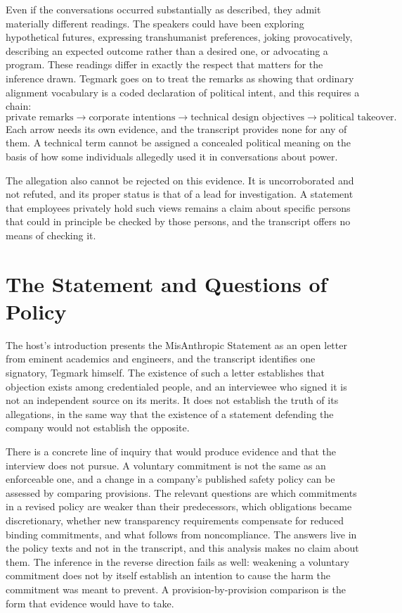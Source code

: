 \documentclass[11pt]{article}
\begin{document}
Even if the conversations occurred substantially as described, they admit materially different readings. The speakers could have been exploring hypothetical futures, expressing transhumanist preferences, joking provocatively, describing an expected outcome rather than a desired one, or advocating a program. These readings differ in exactly the respect that matters for the inference drawn. Tegmark goes on to treat the remarks as showing that ordinary alignment vocabulary is a coded declaration of political intent, and this requires a chain:
\[
\text{private remarks} \longrightarrow \text{corporate intentions} \longrightarrow \text{technical design objectives} \longrightarrow \text{political takeover}.
\]
Each arrow needs its own evidence, and the transcript provides none for any of them. A technical term cannot be assigned a concealed political meaning on the basis of how some individuals allegedly used it in conversations about power.

The allegation also cannot be rejected on this evidence. It is uncorroborated and not refuted, and its proper status is that of a lead for investigation. A statement that employees privately hold such views remains a claim about specific persons that could in principle be checked by those persons, and the transcript offers no means of checking it.

\section{The Statement and Questions of Policy}

The host's introduction presents the MisAnthropic Statement as an open letter from eminent academics and engineers, and the transcript identifies one signatory, Tegmark himself. The existence of such a letter establishes that objection exists among credentialed people, and an interviewee who signed it is not an independent source on its merits. It does not establish the truth of its allegations, in the same way that the existence of a statement defending the company would not establish the opposite.

There is a concrete line of inquiry that would produce evidence and that the interview does not pursue. A voluntary commitment is not the same as an enforceable one, and a change in a company's published safety policy can be assessed by comparing provisions. The relevant questions are which commitments in a revised policy are weaker than their predecessors, which obligations became discretionary, whether new transparency requirements compensate for reduced binding commitments, and what follows from noncompliance. The answers live in the policy texts and not in the transcript, and this analysis makes no claim about them. The inference in the reverse direction fails as well: weakening a voluntary commitment does not by itself establish an intention to cause the harm the commitment was meant to prevent. A provision-by-provision comparison is the form that evidence would have to take.
\end{document}
